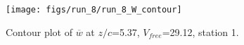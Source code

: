 \begin{figure}[H]
\centering
\texttt{[image: figs/run\_8/run\_8\_W\_contour]}
\caption{Contour plot of $\overline{w}$ at $z/c$=5.37, $V_{free}$=29.12, station 1.}
\label{fig:run_8_W_contour}
\end{figure}


